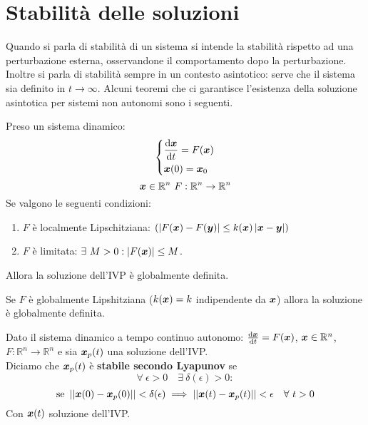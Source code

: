 \section{Stabilità delle soluzioni}%
\label{sub:Stabilità delle soluzioni}
Quando si parla di stabilità di un sistema si intende la stabilità rispetto ad una perturbazione esterna, osservandone il comportamento dopo la perturbazione.\\
Inoltre si parla di stabilità sempre in un contesto asintotico: serve che il sistema sia definito in $t\to \infty$. Alcuni teoremi che ci garantisce l'esistenza della soluzione asintotica per sistemi non autonomi sono i seguenti.
\begin{thm}
    Preso un sistema dinamico:
    \[\begin{dcases}
        \frac{\text{d} \boldsymbol{x}}{\text{d} t} = F(\boldsymbol{x}) \\
	\boldsymbol{x} (0)=\boldsymbol{x}_0
    \end{dcases}\] 
    \[
	\boldsymbol{x}\in \mathbb{R}^n \ F: \mathbb{R}^n \to \mathbb{R}^n  
    \] 
    Se valgono le seguenti condizioni:
    \begin{enumerate}
        \item $F$ è localmente Lipschitziana: $(\left|F(\boldsymbol{x})- F(\boldsymbol{y})\right|\le k(\boldsymbol{x})\left|\boldsymbol{x}-\boldsymbol{y}\right|)$
	\item $F$ è limitata: $\exists \ M >0 : \left|F(\boldsymbol{x})\right|\le M$.
    \end{enumerate}
    Allora la soluzione dell'IVP è globalmente definita.
\end{thm}
\noindent
\begin{thm}
    Se $F$ è globalmente Lipshitziana ($k(\boldsymbol{x})=k$ indipendente da $\boldsymbol{x}$) allora la soluzione è globalmente definita.
\end{thm}
\noindent
\begin{defn}
    Dato il sistema dinamico a tempo continuo autonomo: $\frac{\text{d} \boldsymbol{x}}{\text{d} t} = F(\boldsymbol{x})$, $\boldsymbol{x}\in \mathbb{R}^n$, $F: \mathbb{R}^n\to \mathbb{R}^n$ e sia $\boldsymbol{x}_p(t)$ una soluzione dell'IVP.\\
    Diciamo che $\boldsymbol{x}_p(t)$ è \textbf{stabile secondo Lyapunov} se
    \[
    \forall \ \epsilon  > 0 \quad \exists \ \delta (\epsilon)>0:
    \] 
    \[
	\text{se } \left|\left|\boldsymbol{x}(0)-\boldsymbol{x}_p(0)\right|\right|< \delta (\epsilon) \implies  
	\left|\left|\boldsymbol{x} (t)-\boldsymbol{x}_p(t)\right|\right|<\epsilon  \quad \forall \ t >0
    \] 
    Con $\boldsymbol{x} (t)$ soluzione dell'IVP.
\end{defn}
